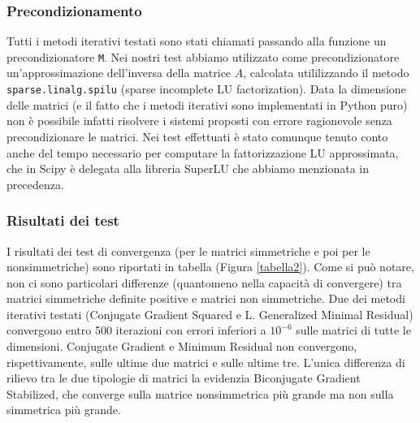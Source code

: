 \documentclass[11pt,a4paper]{scrartcl}
\begin{document}
\subsubsection*{Precondizionamento}

Tutti i metodi iterativi testati sono stati chiamati passando alla funzione un precondizionatore \texttt{M}. Nei nostri test abbiamo utilizzato come precondizionatore un'approssimazione dell'inversa della matrice $A$, calcolata utililizzando il metodo \texttt{sparse.linalg.spilu} (sparse incomplete LU factorization). 
Data la dimensione delle matrici (e il fatto che i metodi iterativi sono implementati in Python puro) non è possibile infatti risolvere i sistemi proposti con errore ragionevole senza precondizionare le matrici. Nei test effettuati è stato comunque tenuto conto anche del tempo necessario per computare la fattorizzazione LU approssimata, che in Scipy è delegata alla libreria SuperLU che abbiamo menzionata in precedenza.

\subsubsection*{Risultati dei test}

I risultati dei test di convergenza (per le matrici simmetriche e poi per le nonsimmetriche) sono riportati in tabella (Figura \ref{tabella2}). Come si può notare, non ci sono particolari differenze (quantomeno nella capacità di convergere) tra matrici simmetriche definite positive e matrici non simmetriche. Due dei metodi iterativi testati (Conjugate Gradient Squared e L. Generalized Minimal Residual) convergono entro 500 iterazioni con errori inferiori a $10^{-6}$ sulle matrici di tutte le dimensioni. Conjugate Gradient e Minimum Residual non convergono, rispettivamente, sulle ultime due matrici e sulle ultime tre. L'unica differenza di rilievo tra le due tipologie di matrici la evidenzia Biconjugate Gradient Stabilized, che converge sulla matrice nonsimmetrica più grande ma non sulla simmetrica più grande.
\end{document}
